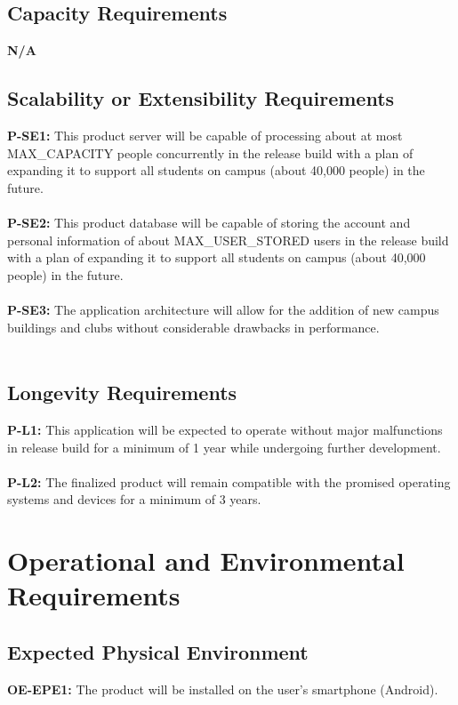 \documentclass[12pt]{article}
\begin{document}
\subsection{Capacity Requirements}
  \textbf{N/A}\\
\subsection{Scalability or Extensibility Requirements}
  \textbf{P-SE1:} This product server will be capable of processing about at most MAX\_CAPACITY people concurrently in the release build with a plan of expanding it to support all students on campus (about 40,000 people) in the future.\\\\
  \textbf{P-SE2:} This product database will be capable of storing the account and personal information of about MAX\_USER\_STORED users in the release build with a plan of expanding it to support all students on campus (about 40,000 people) in the future.\\\\
  \textbf{P-SE3:} The application architecture will allow for the addition of new campus buildings and clubs without considerable drawbacks in performance.\\\\
\subsection{Longevity Requirements}
  \textbf{P-L1:} This application will be expected to operate without major malfunctions in release build for a minimum of 1 year while undergoing further development.\\\\
  \textbf{P-L2:} The finalized product will remain compatible with the promised operating systems and devices for a minimum of 3 years.\\

\section{Operational and Environmental Requirements}
\subsection{Expected Physical Environment}
  \textbf{OE-EPE1:} The product will be installed on the user's smartphone (Android).\\\\
\end{document}
